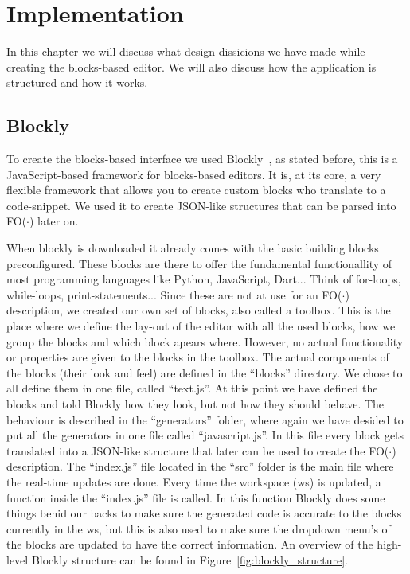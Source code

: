 \documentclass[11pt,a4paper]{report}
\newcommand{\fodot}{FO($\cdot$)\xspace}
\begin{document}
\chapter{Implementation}
In this chapter we will discuss what design-dissicions we have made while creating the blocks-based editor. We will also discuss how the application is structured and how it works.

\section{Blockly}
To create the blocks-based interface we used Blockly~\cite{Blockly}, as stated before, this is a JavaScript-based framework for blocks-based editors. It is, at its core, a very flexible framework that allows you to create custom blocks who translate to a code-snippet. We used it to create JSON-like structures that can be parsed into \fodot later on.

When blockly is downloaded it already comes with the basic building blocks preconfigured. These blocks are there to offer the fundamental functionallity of most programming languages like Python, JavaScript, Dart... Think of for-loops, while-loops, print-statements... Since these are not at use for an \fodot description, we created our own set of blocks, also called a toolbox. This is the place where we define the lay-out of the editor with all the used blocks, how we group the blocks and which block apears where. However, no actual functionality or properties are given to the blocks in the toolbox. The actual components of the blocks (their look and feel) are defined in the ``blocks'' directory. We chose to all define them in one file, called ``text.js''. At this point we have defined the blocks and told Blockly how they look, but not how they should behave. The behaviour is described in the ``generators'' folder, where again we have desided to put all the generators in one file called ``javascript.js''. In this file every block gets translated into a JSON-like structure that later can be used to create the \fodot description. The ``index.js'' file located in the ``src'' folder is the main file where the real-time updates are done. Every time the workspace (ws) is updated, a function inside the ``index.js'' file is called. In this function Blockly does some things behid our backs to make sure the generated code is accurate to the blocks currently in the ws, but this is also used to make sure the dropdown menu's of the blocks are updated to have the correct information. An overview of the high-level Blockly structure can be found in Figure~\ref{fig:blockly_structure}.
\end{document}
